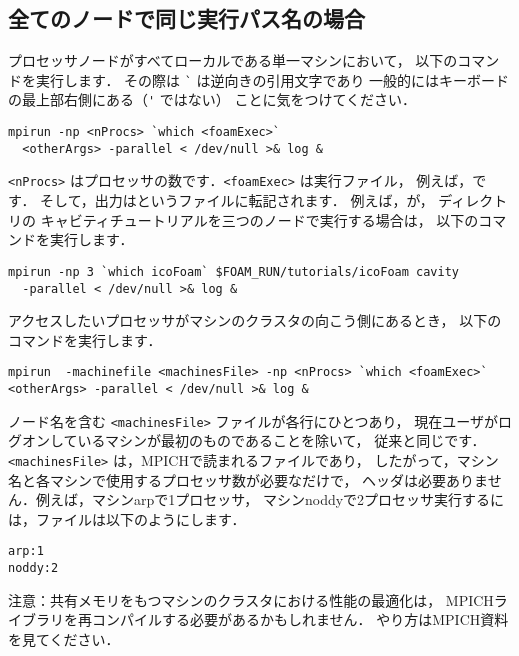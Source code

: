 \subsection{全てのノードで同じ実行パス名の場合}
\label{ssec:B.1.1}
プロセッサノードがすべてローカルである単一マシンにおいて，
以下のコマンドを実行します．
その際は \verb|`| は逆向きの引用文字であり
一般的にはキーボードの最上部右側にある（\verb|'| ではない）
ことに気をつけてください．
\begin{OFterminal}
\begin{verbatim}
mpirun -np <nProcs> `which <foamExec>`
  <otherArgs> -parallel < /dev/null >& log &
\end{verbatim}
\end{OFterminal}
\verb|<nProcs>| はプロセッサの数です．\verb|<foamExec>| は実行ファイル，
例えば，です．
そして，出力はというファイルに転記されます．
例えば，が，
ディレクトリの
キャビティチュートリアルを三つのノードで実行する場合は，
以下のコマンドを実行します．
\begin{OFterminal}
\begin{verbatim}
mpirun -np 3 `which icoFoam` $FOAM_RUN/tutorials/icoFoam cavity
  -parallel < /dev/null >& log &
\end{verbatim}%
\end{OFterminal}
アクセスしたいプロセッサがマシンのクラスタの向こう側にあるとき，
以下のコマンドを実行します．
\begin{OFterminal}
\begin{verbatim}
mpirun  -machinefile <machinesFile> -np <nProcs> `which <foamExec>`
<otherArgs> -parallel < /dev/null >& log &
\end{verbatim}
\end{OFterminal}
ノード名を含む \verb|<machinesFile>| ファイルが各行にひとつあり，
現在ユーザがログオンしているマシンが最初のものであることを除いて，
従来と同じです．\verb|<machinesFile>| は，MPICHで読まれるファイルであり，
したがって，マシン名と各マシンで使用するプロセッサ数が必要なだけで，
ヘッダは必要ありません．例えば，マシンarpで1プロセッサ，
マシンnoddyで2プロセッサ実行するには，ファイルは以下のようにします．
\begin{OFfile}
\begin{verbatim}
arp:1
noddy:2
\end{verbatim}
\end{OFfile}
注意：共有メモリをもつマシンのクラスタにおける性能の最適化は，
MPICHライブラリを再コンパイルする必要があるかもしれません．
やり方はMPICH資料を見てください．


